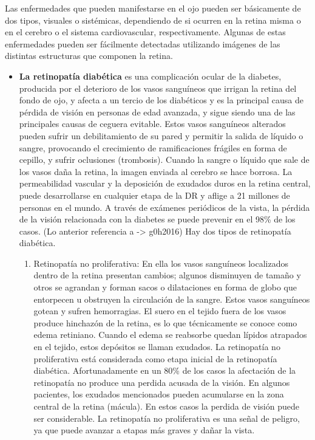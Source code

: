Las enfermedades que pueden manifestarse en el ojo pueden ser b\'asicamente de dos tipos, visuales o sist\'emicas, dependiendo de si ocurren en la retina misma o en el cerebro o el sistema cardiovascular, respectivamente. Algunas de estas enfermedades pueden ser f\'acilmente detectadas utilizando im\'agenes de las distintas estructuras que componen la retina.
\begin{itemize}
	\item \textbf{La retinopat\'ia diab\'etica} es una complicaci\'on ocular de la diabetes, producida por el deterioro de los vasos sangu\'ineos que irrigan la retina del fondo de ojo,  y afecta a un tercio de los diab\'eticos  y es la principal causa de p\'erdida de visi\'on en personas de edad avanzada,  y sigue siendo una de las principales causas de ceguera evitable. Estos vasos sangu\'ineos alterados pueden sufrir un debilitamiento de su pared y permitir la salida de l\'iquido o sangre, provocando el crecimiento de ramificaciones fr\'agiles en forma de cepillo, y sufrir oclusiones (trombosis). Cuando la sangre o l\'iquido que sale de los vasos daña la retina, la imagen enviada al cerebro se hace borrosa. La permeabilidad vascular y la deposici\'on de exudados duros en la retina central, puede desarrollarse en cualquier etapa de la DR y aflige a 21 millones de personas en el mundo.  A trav\'es de ex\'amenes peri\'odicos de la vista, la p\'erdida de la visi\'on relacionada con la diabetes se puede prevenir en el 98\% de los casos. (Lo anterior referencia a -> g0h2016)
 Hay dos tipos de retinopat\'ia diab\'etica. 
\begin{enumerate}
	\item Retinopat\'ia no proliferativa: En ella los vasos sangu\'ineos localizados dentro de la retina presentan cambios; algunos disminuyen de tamaño y otros se agrandan y forman sacos o dilataciones en forma de globo que entorpecen u obstruyen la circulaci\'on de la sangre. Estos vasos sangu\'ineos gotean y sufren hemorragias. El suero en el tejido fuera de los vasos produce hinchaz\'on de la retina, es lo que t\'ecnicamente se conoce como edema retiniano. Cuando el edema se reabsorbe quedan l\'ipidos atrapados en el tejido, estos depósitos se llaman exudados.
La retinopatía no proliferativa est\'a considerada como etapa inicial de la retinopat\'ia diab\'etica. Afortunadamente en un 80\% de los casos la afectaci\'on de la retinopatía no produce una perdida acusada de la visi\'on. En algunos pacientes, los exudados mencionados pueden acumularse en la zona central de la retina (m\'acula). En estos casos la perdida de visi\'on puede ser considerable. La retinopat\'ia no proliferativa es una señal de peligro, ya que puede avanzar a etapas m\'as graves y dañar la vista.

\end{enumerate}
\end{itemize}
